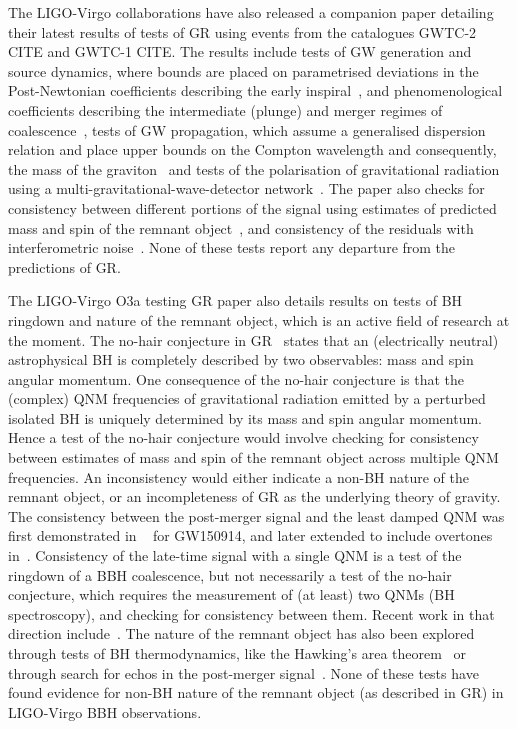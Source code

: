 \documentclass[twocolumn,prd,superscriptaddress,amsfonts,amssymb,amsmath,preprintnumbers]{revtex4-1}
\begin{document}
\par
The LIGO-Virgo collaborations have also released a companion paper detailing their latest results of tests of GR using events from the catalogues GWTC-2 CITE and GWTC-1 CITE. The results include tests of GW generation and source dynamics, where bounds are placed on parametrised deviations in the Post-Newtonian coefficients describing the early inspiral~\citep{earlydevelopmentpapers}, and phenomenological coefficients describing the intermediate (plunge) and merger regimes of coalescence~\citep{TIGERmethodspapers}, tests of GW propagation, which assume a generalised dispersion relation and place upper bounds on the Compton wavelength and consequently, the mass of the graviton~\citep{gw170104,samajdar2017projected} and tests of the polarisation of gravitational radiation using a multi-gravitational-wave-detector network~\citep{gw170814,isi2017probing}. The paper also checks for consistency between different portions of the signal using estimates of predicted mass and spin of the remnant object~\citep{Ghosh:2016xx,Ghosh:2017gfp,LSC_2016grtests}, and consistency of the residuals with interferometric noise~\citep{Ghonge:2020suv,gwtc1_tgr}. None of these tests report any departure from the predictions of GR.
\par
The LIGO-Virgo O3a testing GR paper also details results on tests of BH ringdown and nature of the remnant object, which is an active field of research at the moment. The no-hair conjecture in GR~\citep{} states that an (electrically neutral) astrophysical BH is completely described by two observables: mass and spin angular momentum. One consequence of the no-hair conjecture is that the (complex) QNM frequencies of gravitational radiation emitted by a perturbed isolated BH is uniquely determined by its mass and spin angular momentum. Hence a test of the no-hair conjecture would involve checking for consistency between estimates of mass and spin of the remnant object across multiple QNM frequencies. An inconsistency would either indicate a non-BH nature of the remnant object, or an incompleteness of GR as the underlying theory of gravity. The consistency between the post-merger signal and the least damped QNM was first demonstrated in ~\citep{LSC_2016grtests} for GW150914, and later extended to include overtones in~\citep{Brito:2018rfr,Giesler:2019uxc,Isi:2019aib,Bhagwat:2019dtm,Forteza:2020hbw}. Consistency of the late-time signal with a single QNM is a test of the ringdown of a BBH coalescence, but not necessarily a test of the no-hair conjecture, which requires the measurement of (at least) two QNMs (BH spectroscopy), and checking for consistency between them. Recent work in that direction include~\citep{Carullo:2018gah,Carullo:2019flw,Bhagwat:2019bwv}. The nature of the remnant object has also been explored through tests of BH thermodynamics, like the Hawking's area theorem~\citep{Cabero:2017avf} or through search for echos in the post-merger signal~\citep{Nielsen:2018lkf,Tsang:2019zra,Lo:2018sep,Abedi:2018npz,Abedi:2020sgg,Testa:2018bzd}. None of these tests have found evidence for non-BH nature of the remnant object (as described in GR) in LIGO-Virgo BBH observations.
\end{document}
